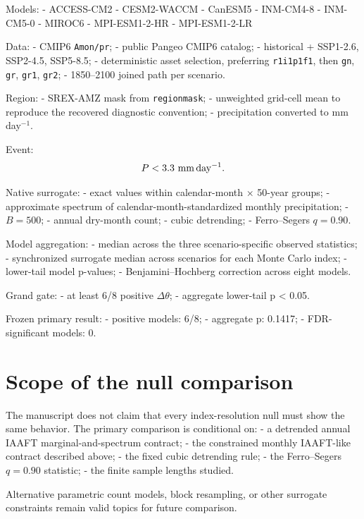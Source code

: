 Models: - ACCESS-CM2 - CESM2-WACCM - CanESM5 - INM-CM4-8 - INM-CM5-0 - MIROC6 - MPI-ESM1-2-HR - MPI-ESM1-2-LR

Data: - CMIP6 \texttt{Amon/pr}; - public Pangeo CMIP6 catalog; - historical + SSP1-2.6, SSP2-4.5, SSP5-8.5; - deterministic asset selection, preferring \texttt{r1i1p1f1}, then \texttt{gn}, \texttt{gr}, \texttt{gr1}, \texttt{gr2}; - 1850--2100 joined path per scenario.

Region: - SREX-AMZ mask from \texttt{regionmask}; - unweighted grid-cell mean to reproduce the recovered diagnostic convention; - precipitation converted to mm day\(^{-1}\).

Event: \[
P<3.3\ {\rm mm\,day^{-1}}.
\]

Native surrogate: - exact values within calendar-month × 50-year groups; - approximate spectrum of calendar-month-standardized monthly precipitation; - \(B=500\); - annual dry-month count; - cubic detrending; - Ferro--Segers \(q=0.90\).

Model aggregation: - median across the three scenario-specific observed statistics; - synchronized surrogate median across scenarios for each Monte Carlo index; - lower-tail model p-values; - Benjamini--Hochberg correction across eight models.

Grand gate: - at least 6/8 positive \(\Delta\theta\); - aggregate lower-tail p \textless{} 0.05.

Frozen primary result: - positive models: 6/8; - aggregate p: 0.1417; - FDR-significant models: 0.

\section{Scope of the null comparison}\label{scope-of-the-null-comparison}

The manuscript does not claim that every index-resolution null must show the same behavior. The primary comparison is conditional on: - a detrended annual IAAFT marginal-and-spectrum contract; - the constrained monthly IAAFT-like contract described above; - the fixed cubic detrending rule; - the Ferro--Segers \(q=0.90\) statistic; - the finite sample lengths studied.

Alternative parametric count models, block resampling, or other surrogate constraints remain valid topics for future comparison.
